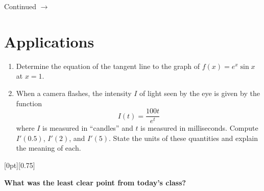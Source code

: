 \documentclass[11pt]{article}
\newcommand{\cuthere}{%
\noindent
\raisebox{-2.8pt}[0pt][0.75\baselineskip]{\small\ding{34}}
\unskip{\tiny\dotfill}
}
\def\ra{\rightarrow}
\def\pageturn{\vfill 
\begin{flushright}
	\begin{small}
		Continued $\ra$
	\end{small}
\end{flushright} \newpage}
\begin{document}
\pageturn

\section{Applications}

\begin{enumerate}
	\item Determine the equation of the tangent line to the graph of $f(x) = e^x \sin x$ at $x = 1$. 
	
	\vspace{3in}
	
	\item When a camera flashes, the intensity $I$ of light seen by the eye is given by the function 
	\[ I(t) = \frac{100t}{e^t} \]
where $I$ is measured in ``candles'' and $t$ is measured in milliseconds. Compute $I'(0.5)$, $I'(2)$, and $I'(5)$. State the units of these quantities and explain the meaning of each. 
\end{enumerate}

\vfill

\cuthere

\noindent
\textbf{What was the least clear point from today's class?}

\vspace{1in}
\end{document}
